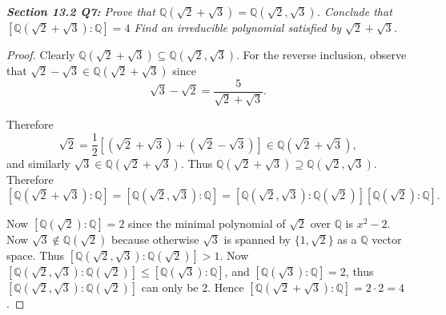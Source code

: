 \documentclass{article}
\begin{document}
\it \textbf{Section 13.2 Q7:} Prove that $\mathbb{Q}(\sqrt{2}+\sqrt{3})
  =\mathbb{Q}(\sqrt{2},\sqrt{3})$. Conclude that
  $[\mathbb{Q}(\sqrt{2}+\sqrt{3}):\mathbb{Q}]=4$ Find an irreducible
  polynomial satisfied by $\sqrt{2}+\sqrt{3}$.

  \begin{proof}
    Clearly $\mathbb{Q}(\sqrt{2}+\sqrt{3})
    \subseteq\mathbb{Q}(\sqrt{2},\sqrt{3})$. For the reverse inclusion,
    observe that $\sqrt{2}-\sqrt{3} \in\mathbb{Q}(\sqrt{2}+\sqrt{3})$ since
    \[\sqrt{3}-\sqrt{2} =\frac{5}{\sqrt{2}+\sqrt{3}}.\]

    Therefore
    \[\sqrt{2} =\frac{1}{2} [(\sqrt{2}+\sqrt{3}) +(\sqrt{2}-\sqrt{3})]
    \in\mathbb{Q}(\sqrt{2}+\sqrt{3}),\]
    and similarly $\sqrt{3} \in\mathbb{Q}(\sqrt{2}+\sqrt{3})$. Thus
    $\mathbb{Q}(\sqrt{2}+\sqrt{3}) \supseteq\mathbb{Q}(\sqrt{2},\sqrt{3})$.
    \\

    Therefore
    \[[\mathbb{Q}(\sqrt{2}+\sqrt{3}):\mathbb{Q}]
    =[\mathbb{Q}(\sqrt{2},\sqrt{3}):\mathbb{Q}]
    =[\mathbb{Q}(\sqrt{2},\sqrt{3}):\mathbb{Q}(\sqrt{2})]
    [\mathbb{Q}(\sqrt{2}):\mathbb{Q}].\]

    Now $[\mathbb{Q}(\sqrt{2}):\mathbb{Q}]=2$ since the minimal polynomial
    of $\sqrt{2}$ over $\mathbb{Q}$ is $x^2-2$. Now
    $\sqrt{3}\not\in\mathbb{Q}(\sqrt{2})$ because otherwise $\sqrt{3}$ is
    spanned by $\{1,\sqrt{2}\}$ as a $\mathbb{Q}$ vector space. Thus
    $[\mathbb{Q}(\sqrt{2},\sqrt{3}):\mathbb{Q}(\sqrt{2})] >1$. Now
    $[\mathbb{Q}(\sqrt{2},\sqrt{3}):\mathbb{Q}(\sqrt{2})]
    \leq[\mathbb{Q}(\sqrt{3}):\mathbb{Q}]$, and
    $[\mathbb{Q}(\sqrt{3}):\mathbb{Q}]=2$, thus
    $[\mathbb{Q}(\sqrt{2},\sqrt{3}):\mathbb{Q}(\sqrt{2})]$ can only be 2.
    Hence $[\mathbb{Q}(\sqrt{2}+\sqrt{3}):\mathbb{Q}]=2\cdot2=4$.
  \end{proof}
\end{document}
